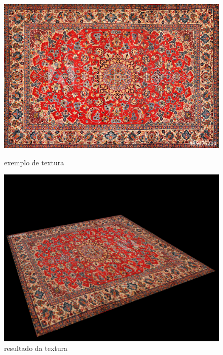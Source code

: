\documentclass[a4paper]{report}
\begin{document}
\begin{figure}[H]
    \centering
    \begin{minipage}{0.49\textwidth}
        \centering
        \includegraphics[width=\textwidth]{images/persian_carpet.jpg}
        \caption{exemplo de textura}
    \end{minipage}\hfill
    \begin{minipage}{0.5\textwidth}
        \centering
        \includegraphics[width=\textwidth]{images/persian_carpet_rendered.png}
        \caption{resultado da textura}
    \end{minipage}\hfill
\end{figure}
\end{document}
